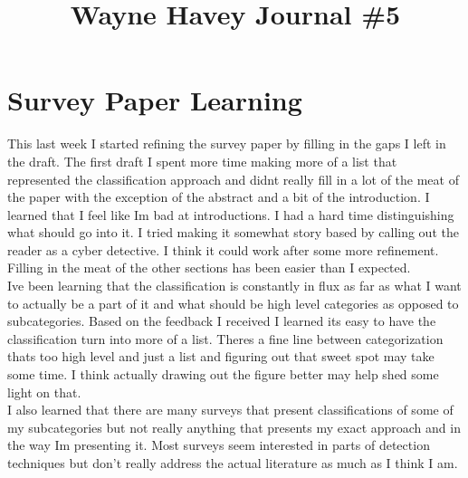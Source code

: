 \documentclass[conference]{IEEEtran}
\begin{document}
\title{Wayne Havey Journal \#5\\
}

\author{
}

\maketitle

\section{Survey Paper Learning}
This last week I started refining the survey paper by filling in the gaps I left in the draft. The first draft I spent more time making more of a list that represented the classification approach and didnt really fill in a lot of the meat of the paper with the exception of the abstract and a bit of the introduction. I learned that I feel like Im bad at introductions. I had a hard time distinguishing what should go into it. I tried making it somewhat story based by calling out the reader as a cyber detective. I think it could work after some more refinement. Filling in the meat of the other sections has been easier than I expected. \\
Ive been learning that the classification is constantly in flux as far as what I want to actually be a part of it and what should be high level categories as opposed to subcategories. Based on the feedback I received I learned its easy to have the classification turn into more of a list. Theres a fine line between categorization thats too high level and just a list and figuring out that sweet spot may take some time. I think actually drawing out the figure better may help shed some light on that. \\
I also learned that there are many surveys that present classifications of some of my subcategories but not really anything that presents my exact approach and in the way Im presenting it. Most surveys seem interested in parts of detection techniques but don't really address the actual literature as much as I think I am. 
\end{document}
